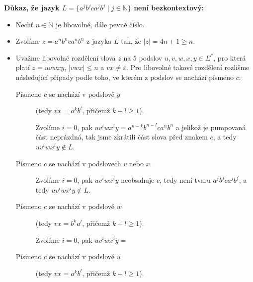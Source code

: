 \documentclass[12pt]{article}
\begin{document}
\textbf{Důkaz, že jazyk $L = \{ a^jb^jca^jb^j \mid j \in \mathbb{N} \}$ není bezkontextový:}

\begin{itemize}
    \item Nechť $n \in \mathbb{N}$ je libovolné, dále pevné číslo.
    \item Zvolíme $z=a^nb^nca^{n}b^{n}$ z jazyka $L$ tak, že $\lvert z \rvert = 4n+1 \geq n$.
    \item Uvažme libovolné rozdělení slova $z$ na 5 podslov $u, v, w, x, y \in \Sigma^{*}$, pro která platí $z=uvwxy$, $\lvert vwx \rvert \leq n$ a $vx \neq \varepsilon$. Pro libovolné takové rozdělení rozlišme následující případy podle toho, ve kterém z podslov se nachází písmeno $c$:

    \begin{description}
        \item[Písmeno $c$ se nachází v podslově $y$] (tedy $vx = a^kb^l$, přičemž $k+l \geq 1$).
        
        Zvolíme $i=0$, pak $uv^iwx^iy=a^{n-k}b^{n-l}ca^{n}b^{n}$ a jelikož je pumpovaná část neprázdná, tak jsme zkrátili část slova před znakem $c$, a tedy $uv^iwx^iy \notin L$.

        \item[Písmeno $c$ se nachází v podslovech $v$ nebo $x$.]
        
        Zvolíme $i=0$, pak $uv^iwx^iy$ neobsahuje $c$, tedy není tvaru $a^jb^jca^jb^j$, a tedy $uv^iwx^iy \notin L$.

        \item[Písmeno $c$ se nachází v podslově $w$] (tedy $vx = b^ka^l$, přičemž $k+l \geq 1$).
        
        Zvolíme $i=0$, pak $uv^iwx^iy =$ \vspace{2cm} %

        \item[Písmeno $c$ se nachází v podslově $u$] (tedy $vx = a^kb^l$, přičemž $k+l \geq 1$).
        
        \vspace{2cm} 

    \end{description}
\end{itemize}
\end{document}
